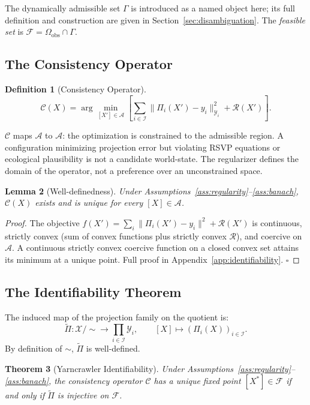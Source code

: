 \documentclass[12pt, oneside]{article}
\newtheorem{theorem}{Theorem}[section]
\newtheorem{lemma}[theorem]{Lemma}
\newtheorem{definition}[theorem]{Definition}
\newcommand{\Xmod}{\mathcal{X}/{\sim}}
\newcommand{\Ftil}{\widetilde{\Pi}}
\begin{document}
The dynamically admissible set $\Gamma$ is introduced as a named object here; its full
definition and construction are given in Section~\ref{sec:disambiguation}. The
\emph{feasible set} is $\mathcal{F} = \Omega_{\mathrm{obs}} \cap \Gamma$.

\subsection{The Consistency Operator}

\begin{definition}[Consistency Operator]
\[
\mathcal{C}(X) = \arg\min_{[X'] \in \mathcal{A}}
\left[ \sum_{i \in \mathcal{I}} \|\Pi_i(X') - y_i\|_{\mathcal{Y}_i}^2
+ \mathcal{R}(X') \right].
\]
\end{definition}

$\mathcal{C}$ maps $\mathcal{A}$ to $\mathcal{A}$: the optimization is constrained to the
admissible region. A configuration minimizing projection error but violating RSVP equations
or ecological plausibility is not a candidate world-state. The regularizer defines the
domain of the operator, not a preference over an unconstrained space.

\begin{lemma}[Well-definedness]
Under Assumptions~\ref{ass:regularity}--\ref{ass:banach}, $\mathcal{C}(X)$ exists and is
unique for every $[X] \in \mathcal{A}$.
\end{lemma}
\begin{proof}
The objective $f(X') = \sum_i \|\Pi_i(X') - y_i\|^2 + \mathcal{R}(X')$ is continuous,
strictly convex (sum of convex functions plus strictly convex $\mathcal{R}$), and coercive
on $\mathcal{A}$. A continuous strictly convex coercive function on a closed convex set
attains its minimum at a unique point. Full proof in Appendix~\ref{app:identifiability}.
$\square$
\end{proof}

\subsection{The Identifiability Theorem}

The induced map of the projection family on the quotient is:
\[
\Ftil : \Xmod \longrightarrow \prod_{i \in \mathcal{I}} \mathcal{Y}_i, \qquad
[X] \mapsto (\Pi_i(X))_{i \in \mathcal{I}}.
\]
By definition of $\sim$, $\Ftil$ is well-defined.

\begin{theorem}[Yarncrawler Identifiability]
\label{thm:identifiability}
Under Assumptions~\ref{ass:regularity}--\ref{ass:banach}, the consistency operator
$\mathcal{C}$ has a unique fixed point $[X^*] \in \mathcal{F}$ if and only if $\Ftil$
is injective on $\mathcal{F}$.
\end{theorem}
\end{document}
